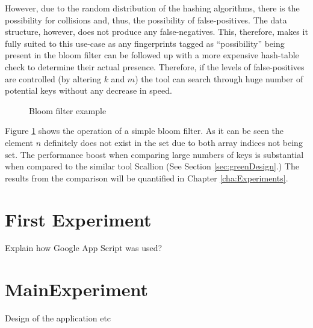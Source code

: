 However, due to the random distribution of the hashing algorithms, there is the possibility for collisions and, thus, the possibility of false-positives. The data structure, however, does not produce any false-negatives. This, therefore, makes it fully suited to this use-case as any fingerprints tagged as ``possibility'' being present in the bloom filter can be followed up with a more expensive hash-table check to determine their actual presence. Therefore, if the levels of false-positives are controlled (by altering $k$ and $m$) the tool can search through huge number of potential keys without any decrease in speed.

\begin{figure}[h!]
    \centering
    
    \caption{Bloom filter example}
    \label{fig:bloom}
\end{figure}

Figure \ref{fig:bloom} shows the operation of a simple bloom filter. As it can be seen the element $n$ definitely does not exist in the set due to both array indices not being set. The performance boost when comparing large numbers of keys is substantial when compared to the similar tool Scallion (See Section \ref{sec:greenDesign}.) The results from the comparison will be quantified in Chapter \ref{cha:Experiments}.

\section{First Experiment}
Explain how Google App Script was used?

\section{MainExperiment}
Design of the application etc


